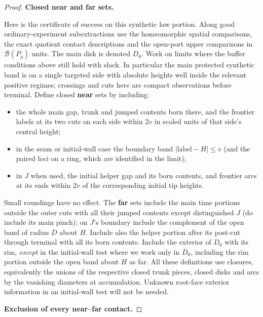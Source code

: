 \begin{proof}

\smallskip
\noindent\textbf{Closed near and far sets.}\quad

Here is the certificate of success on this synthetic law portion. Along good
ordinary-experiment subextractions use the homeomorphic spatial comparisons, the exact
quotient contact descriptions and the open-port upper comparisons in \(\mathcal B(P_y)\)
units. The main disk is denoted \(D_0\). Work on limits where the buffer conditions above
still hold with slack. In particular the main protected synthetic band is on a single
targeted side with absolute heights well inside the relevant positive regimes; crossings
and cuts here are compact observations before terminal. Define closed \textbf{near} sets
by including:

\begin{itemize}
\item
  the whole main gap, trunk and jumped contents born there, and the frontier labels at its
  two cuts on each side within \(2v\) in scaled units of that side's central height;
\item
  in the seam or initial-wall case the boundary band \(|\text{label}-H|\le v\) (and the
  paired loci on a ring, which are identified in the limit);
\item
  in \(J\) when used, the initial helper gap and its born contents, and frontier arcs at
  its ends within \(2v\) of the corresponding initial tip heights.
\end{itemize}
Small roundings have no effect. The \textbf{far} sets include the main time portions
outside the outer cuts with all their jumped contents except distinguished \(J\)
(do include its main pinch); on \(J\)'s boundary include the complement of the
open band of radius \(D\) about \(H\). Include also the helper portion after its
post-cut through terminal with all its born contents. Include the exterior of
\(D_0\) with its rim, \emph{except} in the initial-wall test where we work only
in \(\overline D_0\), including the rim portion outside the open band about
\(H\) as far. All these definitions use closures, equivalently the unions of
the respective closed trunk pieces, closed disks and arcs by the vanishing
diameters at accumulation. Unknown root-face exterior information in an
initial-wall test will not be needed.

\smallskip
\noindent\textbf{Exclusion of every near--far contact.}\quad


\end{proof}
